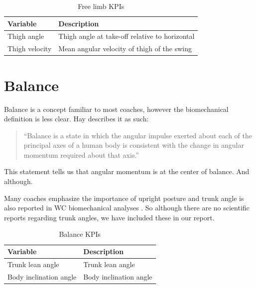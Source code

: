 \documentclass[]{scrreprt}
\begin{document}
\begin{table}

\caption{\label{tab:free-limb-desc}Free limb KPIs}
\centering
\begin{tabular}[t]{>{\raggedright\arraybackslash}p{15em}|l}
\hline
Variable & Description\\
\hline
Thigh angle & Thigh angle at take-off relative to horizontal\\
\hline
Thigh velocity & Mean angular velocity of thigh of the swing\\
\hline
\end{tabular}
\end{table}

\clearpage

\hypertarget{balance}{%
\section{Balance}\label{balance}}

Balance is a concept familiar to most coaches, however the biomechanical definition is less clear. Hay \autocite{Hay1993} describes it as such:

\begin{quote}
``Balance is a state in which the angular impulse exerted about each of the principal axes of a human body is consistent with the change in angular momentum required about that axis.''
\end{quote}

This statement tells us that angular momentum is at the center of balance. And although.

Many coaches emphasize the importance of upright posture and trunk angle is also reported in WC biomechanical analyses \autocites{Hommel2009}{Tucker2017}{Tucker2019}. So although there are no scientific reports regarding trunk angles, we have included these in our report.

\begin{table}

\caption{\label{tab:balance-desc}Balance KPIs}
\centering
\begin{tabular}[t]{>{\raggedright\arraybackslash}p{15em}|l}
\hline
Variable & Description\\
\hline
Trunk lean angle & Trunk lean angle\\
\hline
Body inclination angle & Body inclination angle\\
\hline
\end{tabular}
\end{table}
\end{document}
